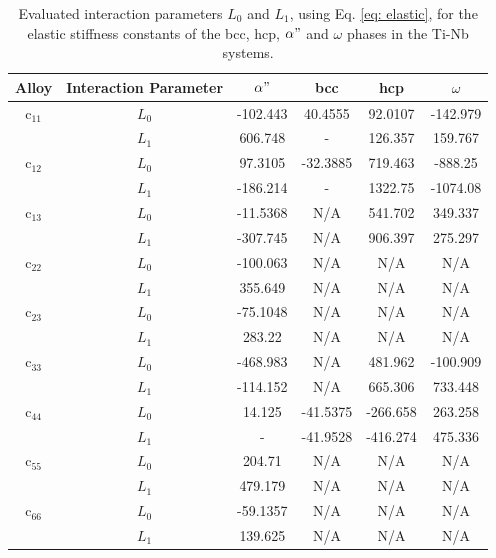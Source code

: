 \newpage
\newpage
\begin{table}[H]
	\caption{Evaluated interaction parameters $L_0$ and $L_1$, using Eq. \ref{eq: elastic}, for the elastic stiffness constants of the bcc, hcp, $\alpha"$ and $\omega$ phases in the Ti-Nb systems.}
	\centering
	\begin{tabular}{ c c c c c c }
		\hline
		Alloy & Interaction Parameter & $\alpha"$ & bcc & hcp & $\omega$\\
		\hline
		c$_{11}$ & $L_{0}$ & -102.443 & 40.4555 & 92.0107 & -142.979 \\
		& $L_{1}$ & 606.748 & - & 126.357 & 159.767 \\
		c$_{12}$ & $L_{0}$ & 97.3105 & -32.3885 & 719.463 & -888.25 \\
		& $L_{1}$ & -186.214 & - & 1322.75 & -1074.08 \\
		c$_{13}$ & $L_{0}$ & -11.5368 & N/A & 541.702 & 349.337 \\
		& $L_{1}$ & -307.745 & N/A & 906.397 & 275.297 \\
		c$_{22}$ & $L_{0}$ & -100.063 & N/A & N/A & N/A \\
		& $L_{1}$ & 355.649 & N/A & N/A & N/A \\
		c$_{23}$ & $L_{0}$ & -75.1048 & N/A & N/A & N/A \\
		& $L_{1}$ & 283.22 & N/A & N/A & N/A \\
		c$_{33}$ & $L_{0}$ & -468.983 & N/A & 481.962 & -100.909 \\
		& $L_{1}$ & -114.152 & N/A & 665.306 & 733.448 \\
		c$_{44}$ & $L_{0}$ & 14.125 & -41.5375 & -266.658 & 263.258 \\
		& $L_{1}$ & - & -41.9528 & -416.274 & 475.336 \\
		c$_{55}$ & $L_{0}$ & 204.71 & N/A & N/A & N/A \\
		& $L_{1}$ & 479.179 & N/A & N/A & N/A \\
		c$_{66}$ & $L_{0}$ & -59.1357 & N/A & N/A & N/A \\
		& $L_{1}$ & 139.625 & N/A & N/A & N/A \\
		\hline
	\end{tabular}
	\label{Ch7-table:intpara}
\end{table}
\clearpage

